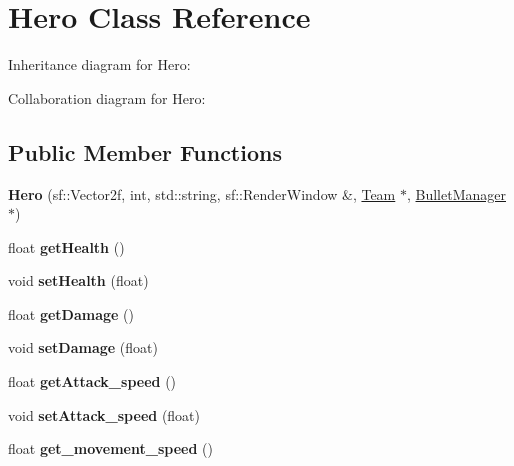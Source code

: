 \hypertarget{class_hero}{\section{Hero Class Reference}
\label{class_hero}
}


Inheritance diagram for Hero\+:


Collaboration diagram for Hero\+:
\subsection*{Public Member Functions}
\begin{DoxyCompactItemize}
\item 
\hypertarget{class_hero_ad89699c9a56ce4096bc61a7837698ae4}{{\bfseries Hero} (sf\+::\+Vector2f, int, std\+::string, sf\+::\+Render\+Window \&, \hyperlink{class_team}{Team} $\ast$, \hyperlink{class_bullet_manager}{Bullet\+Manager} $\ast$)}\label{class_hero_ad89699c9a56ce4096bc61a7837698ae4}

\item 
\hypertarget{class_hero_ac6d7d1872ee3bd90be16c531a64d739d}{float {\bfseries get\+Health} ()}\label{class_hero_ac6d7d1872ee3bd90be16c531a64d739d}

\item 
\hypertarget{class_hero_a8cb823b9ef2f2f881f045376ce0962dc}{void {\bfseries set\+Health} (float)}\label{class_hero_a8cb823b9ef2f2f881f045376ce0962dc}

\item 
\hypertarget{class_hero_a6ae3c67dca1676a5a488c2ec1bbd8979}{float {\bfseries get\+Damage} ()}\label{class_hero_a6ae3c67dca1676a5a488c2ec1bbd8979}

\item 
\hypertarget{class_hero_a90e6f4f2f96b277a66c330714af3a15b}{void {\bfseries set\+Damage} (float)}\label{class_hero_a90e6f4f2f96b277a66c330714af3a15b}

\item 
\hypertarget{class_hero_add43382cd5acd451f210bd39c71c369f}{float {\bfseries get\+Attack\+\_\+speed} ()}\label{class_hero_add43382cd5acd451f210bd39c71c369f}

\item 
\hypertarget{class_hero_a954a937eb1d539a108bfecb7eeaf3dc4}{void {\bfseries set\+Attack\+\_\+speed} (float)}\label{class_hero_a954a937eb1d539a108bfecb7eeaf3dc4}

\item 
\hypertarget{class_hero_aa7bf2af3b0be59df10212ff693acb437}{float {\bfseries get\+\_\+movement\+\_\+speed} ()}\label{class_hero_aa7bf2af3b0be59df10212ff693acb437}


\end{DoxyCompactItemize}
